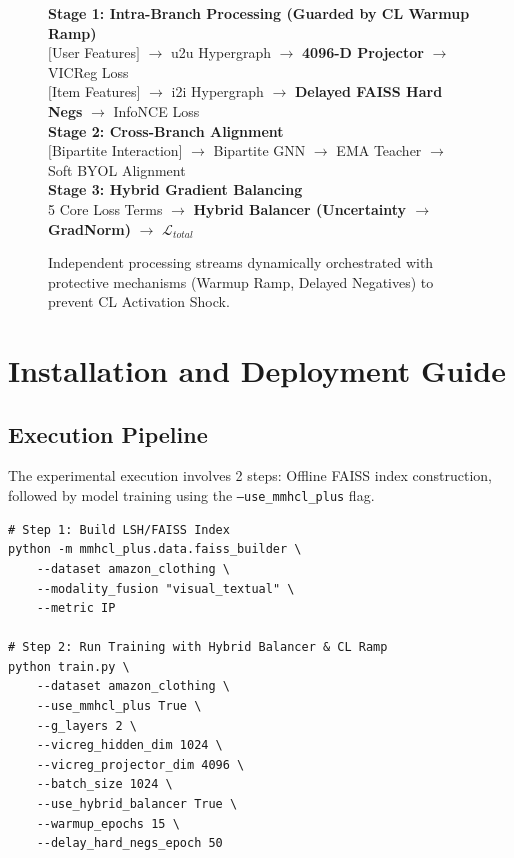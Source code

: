 \begin{figure}[H]
    \centering
    \begin{tcolorbox}[colback=white, colframe=accentblue, width=0.95\textwidth, arc=4pt, boxrule=1pt, 
        title=\textbf{High-Level Architecture Overview of MMHCL-Plus}]
        \centering
        \vspace{0.5em}
        \textbf{Stage 1: Intra-Branch Processing (Guarded by CL Warmup Ramp)} \\[0.3em]
        $[$User Features$]$ $\rightarrow$ u2u Hypergraph $\rightarrow$ \textbf{4096-D Projector} $\rightarrow$ VICReg Loss \\
        $[$Item Features$]$ $\rightarrow$ i2i Hypergraph $\rightarrow$ \textbf{Delayed FAISS Hard Negs} $\rightarrow$ InfoNCE Loss \\[1.2em]
        \textbf{Stage 2: Cross-Branch Alignment} \\[0.3em]
        $[$Bipartite Interaction$]$ $\rightarrow$ Bipartite GNN $\rightarrow$ EMA Teacher $\rightarrow$ Soft BYOL Alignment \\[1.2em]
        \textbf{Stage 3: Hybrid Gradient Balancing} \\[0.3em]
        5 Core Loss Terms $\rightarrow$ \textbf{Hybrid Balancer (Uncertainty $\rightarrow$ GradNorm)} $\rightarrow$ $\mathcal{L}_{total}$
        \vspace{0.2em}
    \end{tcolorbox}
    \caption{Independent processing streams dynamically orchestrated with protective mechanisms (Warmup Ramp, Delayed Negatives) to prevent CL Activation Shock.}
    \label{fig:architecture}
\end{figure}

\section{Installation and Deployment Guide}

\subsection{Execution Pipeline}
The experimental execution involves 2 steps: Offline FAISS index construction, followed by model training using the \texttt{--use\_mmhcl\_plus} flag.
\begin{lstlisting}[style=bashstyle]
# Step 1: Build LSH/FAISS Index 
python -m mmhcl_plus.data.faiss_builder \
    --dataset amazon_clothing \
    --modality_fusion "visual_textual" \
    --metric IP

# Step 2: Run Training with Hybrid Balancer & CL Ramp
python train.py \
    --dataset amazon_clothing \
    --use_mmhcl_plus True \
    --g_layers 2 \
    --vicreg_hidden_dim 1024 \
    --vicreg_projector_dim 4096 \
    --batch_size 1024 \
    --use_hybrid_balancer True \
    --warmup_epochs 15 \
    --delay_hard_negs_epoch 50
\end{lstlisting}

